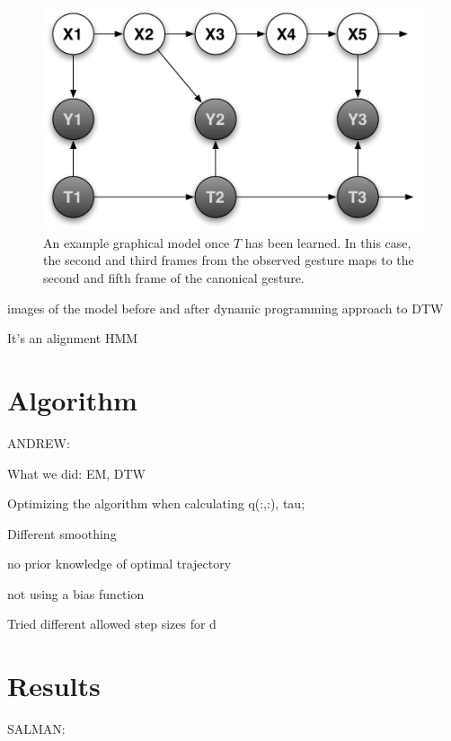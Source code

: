 \documentclass{article}
\begin{document}
\begin{figure}
\begin{centering}
\includegraphics[width=0.65\columnwidth]{figures/model_tau_observed.pdf}

\caption{An example graphical model once $T$ has been learned. In this case,
the second and third frames from the observed gesture maps to the second and
fifth frame of the canonical gesture. \label{figure:model_tau_observed}}

\end{centering}
\end{figure}



images of the model before and after dynamic programming approach to DTW

It's an alignment HMM

\section{Algorithm}

ANDREW:

What we did: EM, DTW

Optimizing the algorithm when calculating q(:,:), tau;

Different smoothing

no prior knowledge of optimal trajectory

not using a bias function

Tried different allowed step sizes for d

\section{Results}

SALMAN:
\end{document}
